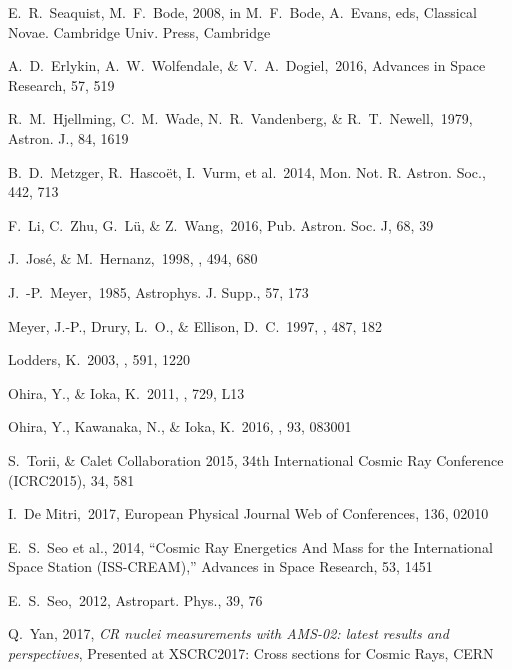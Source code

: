 \documentclass[twocolumn,showpacs,amsmath,amssymb]{revtex4-1}
\begin{document}
\begin{thebibliography}{99}
E.~R.~Seaquist, M.~F.~Bode, 2008, in M.~F.~Bode, A.~Evans, eds, Classical Novae. Cambridge Univ. Press, Cambridge

A.~D.~Erlykin, A.~W.~Wolfendale, \& V.~A.~Dogiel,\ 2016, Advances in Space Research, 57, 519 

R.~M.~Hjellming, C.~M.~Wade, N.~R.~Vandenberg, \& R.~T.~Newell,\ 1979, Astron. J., 84, 1619 

B.~D.~Metzger, R.~Hasco{\"e}t, I.~Vurm, et al.\ 2014, Mon. Not. R. Astron. Soc., 442, 713 

  
F.~Li, C.~Zhu, G.~L{\"u}, \& Z.~Wang,\ 2016, Pub. Astron. Soc. J, 68, 39   

J.~Jos{\'e}, \& M.~Hernanz,\ 1998, \apj, 494, 680 

J.~-P.~Meyer,\ 1985, Astrophys. J. Supp., 57, 173 

Meyer, J.-P., Drury, L.~O., \& Ellison, D.~C.\ 1997, \apj, 487, 182 

Lodders, K.\ 2003, \apj, 591, 1220 

Ohira, Y., \& Ioka, K.\ 2011, \apj, 729, L13 

Ohira, Y., Kawanaka, N., \& Ioka, K.\ 2016, \prd, 93, 083001 


S.~Torii, \& Calet Collaboration 2015, 34th International Cosmic Ray Conference (ICRC2015), 34, 581 

I.~De Mitri,\ 2017, European Physical Journal Web of Conferences, 136, 02010 

E.~S.~Seo et al., 2014, “Cosmic Ray Energetics And Mass for the International Space Station (ISS-CREAM),” Advances in Space Research, 53, 1451 

E.~S.~Seo,\ 2012, Astropart. Phys., 39, 76 

Q.~Yan, 2017, {\it CR nuclei measurements with AMS-02: latest results and perspectives}, Presented at XSCRC2017: Cross sections for Cosmic Rays, CERN

\end{thebibliography}
\end{document}
